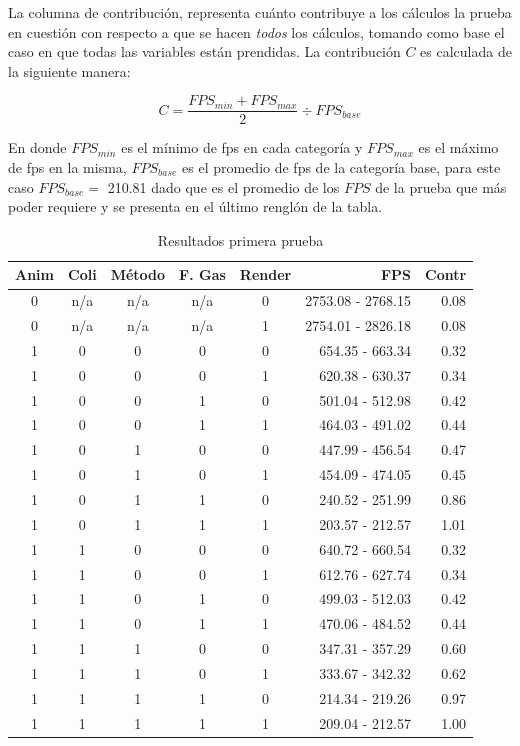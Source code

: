 La columna de contribución, representa cuánto contribuye a los cálculos la prueba en cuestión con respecto a que se hacen \emph{todos} los cálculos, tomando como base el caso en que todas las variables están prendidas.
La contribución $C$ es calculada de la siguiente manera:

$$ C = \frac{FPS_{min} + FPS_{max}}{2} \div FPS_{base}$$

En donde $FPS_{min}$ es el mínimo de fps en cada categoría y $FPS_{max}$ es el máximo de fps en la misma, $FPS_{base}$ es el promedio de fps de la categoría base, para este caso $FPS_{base} =$ 210.81 dado que es el promedio de los $FPS$ de la prueba que más poder requiere y se presenta en el último renglón de la tabla.

\begin{table}
\begin{center}
\begin{tabular} {@{}cccccrr@{}}
\toprule
 Anim & Coli & Método & F. Gas & Render & FPS & Contr\\
\midrule
 0 & n/a & n/a & n/a & 0 & 2753.08 - 2768.15 & 0.08\\
 0 & n/a & n/a & n/a & 1 & 2754.01 - 2826.18 & 0.08\\
 1 & 0 & 0 & 0 & 0 & 654.35 - 663.34 & 0.32\\
 1 & 0 & 0 & 0 & 1 & 620.38 - 630.37 & 0.34\\
 1 & 0 & 0 & 1 & 0 & 501.04 - 512.98 & 0.42\\
 1 & 0 & 0 & 1 & 1 & 464.03 - 491.02 & 0.44\\
 1 & 0 & 1 & 0 & 0 & 447.99 - 456.54 & 0.47\\
 1 & 0 & 1 & 0 & 1 & 454.09 - 474.05 & 0.45\\
 1 & 0 & 1 & 1 & 0 & 240.52 - 251.99 & 0.86\\
 1 & 0 & 1 & 1 & 1 & 203.57 - 212.57 & 1.01\\
 1 & 1 & 0 & 0 & 0 & 640.72 - 660.54 & 0.32\\
 1 & 1 & 0 & 0 & 1 & 612.76 - 627.74 & 0.34\\
 1 & 1 & 0 & 1 & 0 & 499.03 - 512.03 & 0.42\\
 1 & 1 & 0 & 1 & 1 & 470.06 - 484.52 & 0.44\\
 1 & 1 & 1 & 0 & 0 & 347.31 - 357.29 & 0.60\\
 1 & 1 & 1 & 0 & 1 & 333.67 - 342.32 & 0.62\\
 1 & 1 & 1 & 1 & 0 & 214.34 - 219.26 & 0.97\\
 1 & 1 & 1 & 1 & 1 & 209.04 - 212.57 & 1.00\\
\bottomrule
\end{tabular}
\end{center}
\caption[Resultados de la prueba del programa]{Resultados primera prueba}
\label{resultado:prueba1}
\end{table}

